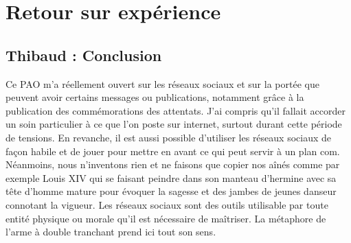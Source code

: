 \section{Retour sur expérience}
\subsection{Thibaud : Conclusion}

Ce PAO m'a réellement ouvert sur les réseaux sociaux et sur la portée que peuvent avoir certains messages ou publications, notamment grâce à la publication des commémorations des attentats. J'ai compris qu'il fallait accorder un soin particulier à ce que l'on poste sur internet, surtout durant cette période de tensions. En revanche, il est aussi possible d'utiliser les réseaux sociaux de façon habile et de jouer pour mettre en avant ce qui peut servir à un plan com.
Néanmoins, nous n'inventons rien et ne faisons que copier nos aînés comme par exemple Louis XIV qui se faisant peindre dans son manteau d'hermine avec sa tête d'homme mature pour évoquer la sagesse et des jambes de jeunes danseur connotant la vigueur.
Les réseaux sociaux sont des outils utilisable par toute entité physique ou morale qu'il est nécessaire de maîtriser. La métaphore de l'arme à double tranchant prend ici tout son sens.